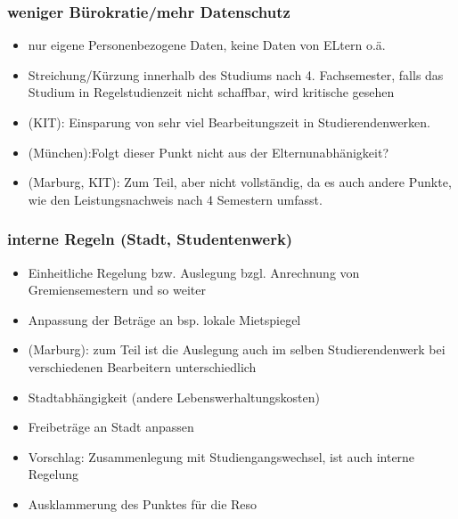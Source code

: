     \subsubsection*{weniger Bürokratie/mehr Datenschutz}
      \begin{itemize}
        \item nur eigene Personenbezogene Daten, keine Daten von ELtern o.ä.
        \item Streichung/Kürzung innerhalb des Studiums nach 4. Fachsemester, falls das Studium in Regelstudienzeit nicht schaffbar, wird kritische gesehen
        \item (KIT): Einsparung von sehr viel Bearbeitungszeit in Studierendenwerken.
        \item (München):Folgt dieser Punkt nicht aus der Elternunabhänigkeit?
        \item (Marburg, KIT): Zum Teil, aber nicht vollständig, da es auch andere Punkte, wie den Leistungsnachweis nach 4 Semestern umfasst.
      \end{itemize}

    \subsubsection*{interne Regeln (Stadt, Studentenwerk)}
      \begin{itemize}
        \item Einheitliche Regelung bzw. Auslegung bzgl. Anrechnung von Gremiensemestern und so weiter
        \item Anpassung der Beträge an bsp. lokale Mietspiegel
        \item (Marburg): zum Teil ist die Auslegung auch im selben Studierendenwerk bei verschiedenen Bearbeitern unterschiedlich
        \item Stadtabhängigkeit (andere Lebenswerhaltungskosten)
        \item Freibeträge an Stadt anpassen
        \item Vorschlag: Zusammenlegung mit Studiengangswechsel, ist auch interne Regelung
        \item Ausklammerung des Punktes für die Reso
      \end{itemize}

